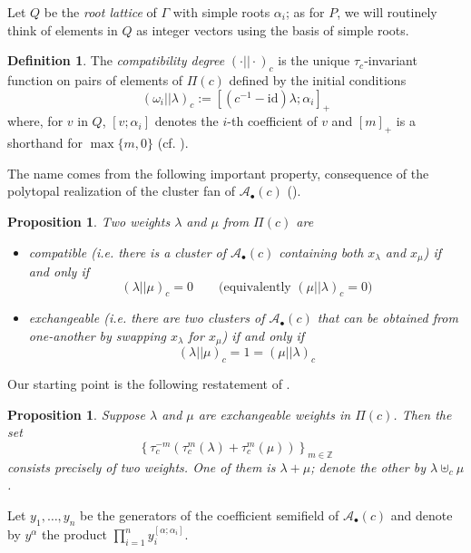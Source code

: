 \documentclass[11pt]{amsart}
\newcommand{\cA}{\mathcal{A}}
\newcommand{\ZZ}{\mathbb{Z}}
\newcommand{\id}{\mathrm{id}}
\newtheorem{proposition}[theorem]{Proposition}
\theoremstyle{definition}
\newtheorem{definition}[theorem]{Definition}
\numberwithin{equation}{section}
\numberwithin{figure}{section}
\begin{document}
  Let $Q$ be the \emph{root lattice} of $\Gamma$ with simple roots $\alpha_i$; as for $P$, we will routinely think of elements in $Q$ as integer vectors using the basis of simple roots.
  \begin{definition}
    The \emph{compatibility degree} $(\cdot||\cdot)_c$ is the unique $\tau_c$-invariant function on pairs of elements of $\Pi(c)$ defined by the initial conditions
    \[
      (\omega_i||\lambda)_c
      :=
      \left[ (c^{-1}-\id)\lambda ; \alpha_i\right]_+
    \]
    where, for $v$ in $Q$, $[v;\alpha_i]$ denotes the $i$-th coefficient of $v$  and $[m]_+$ is a shorthand for $\max\{m, 0\}$ (cf. \cite[Proposition 5.1]{YZ08}).
  \end{definition}
  The name comes from the following important property, consequence of the polytopal realization of the cluster fan of $\cA_\bullet(c)$ (\cite{CFZ02,Ste13}).
  \begin{proposition}
    Two weights $\lambda$ and $\mu$ from $\Pi(c)$ are
    \begin{itemize}
      \item
        \emph{compatible} (i.e. there is a cluster of $\cA_\bullet(c)$ containing both $x_\lambda$ and $x_\mu$) if and only if
        \[
          (\lambda||\mu)_c = 0
          \quad \quad
          \text{(equivalently $(\mu||\lambda)_c=0$)}
        \]

      \item
        \emph{exchangeable} (i.e. there are two clusters of $\cA_\bullet(c)$ that can be obtained from one-another by swapping $x_\lambda$ for $x_\mu$) if and only if
        \[
          (\lambda||\mu)_c = 1 = (\mu||\lambda)_c
        \]
    \end{itemize}
  \end{proposition}

  Our starting point is the following restatement of \cite[Proposition 5.1]{Ste13}.
  \begin{proposition}
    Suppose $\lambda$ and $\mu$ are exchangeable weights in $\Pi(c)$.
    Then the set
    \[
      \left\{
        \tau_c^{-m}\left(\tau_c^m(\lambda)+\tau_c^m(\mu)\right)
      \right\}_{m\in\ZZ}
    \]
    consists precisely of two weights.
    One of them is $\lambda+\mu$; denote the other by $\lambda\uplus_c\mu$.
  \end{proposition}

  Let $y_1,\dots,y_n$ be the generators of the coefficient semifield of $\cA_\bullet(c)$ and denote by $y^\alpha$ the product $\prod_{i=1}^n y_i^{[\alpha;\alpha_i]}$.
\end{document}
